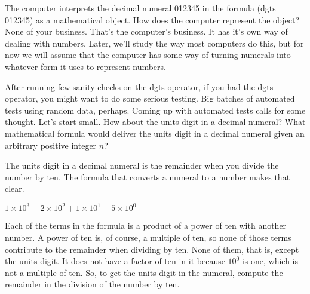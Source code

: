 The computer interprets the
decimal numeral 012345 in the formula \textsf{(dgts 012345)}
as a mathematical object.
How does the computer represent the object? None of your business.
That's the computer's business.
It has it's own way of dealing with numbers.
Later, we'll study the way most computers do this,
but for now we will assume that the computer has some way of turning
numerals into whatever form it uses to represent numbers.

After running few sanity checks on the \textsf{dgts} operator,
if you had the \textsf{dgts} operator, you might want to do some serious testing.
Big batches of automated tests using random data, perhaps.
Coming up with automated tests calls for some thought.
Let's start small. How about the units digit in a decimal numeral?
What mathematical formula would deliver the units digit in a
decimal numeral given an arbitrary positive integer $n$?

The units digit in a decimal numeral is the remainder when you divide
the number by ten. The formula that converts a numeral to a number
makes that clear.
\begin{center}
$1 \times 10^3 + 2 \times 10^2 + 1 \times 10^1 + 5 \times 10^0$
\end{center}

Each of the terms in the formula is a product of a power
of ten with another number. A power of ten is, of course,
a multiple of ten, so none of those terms contribute to the remainder
when dividing by ten. None of them, that is, except the units digit.
It does not have a factor of ten in it because
$10^0$ is one, which is not a multiple of ten.
So, to get the units digit in the numeral,
compute the remainder in the division of the number by ten.


